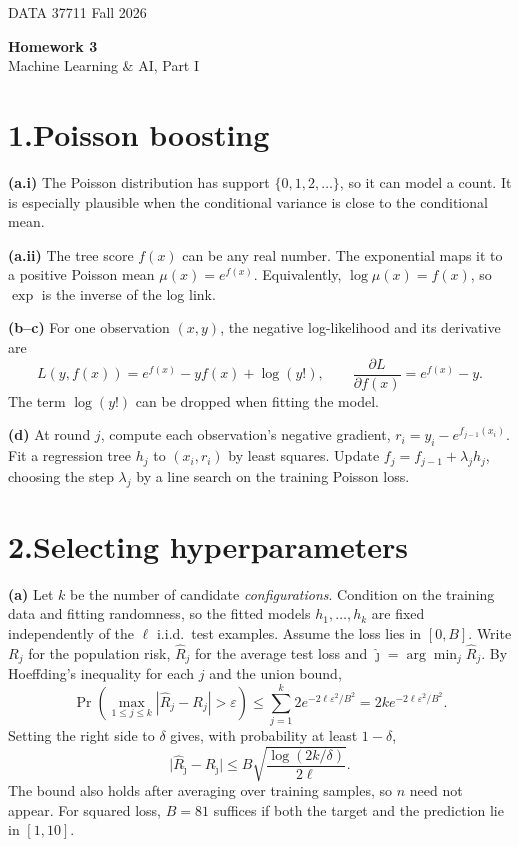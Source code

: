 \documentclass[11pt,letterpaper]{article}
\newcommand{\subpart}[1]{\textbf{(#1)}\enspace}
\newcommand{\Rhat}{\widehat R}
\begin{document}
{\small DATA 37711 \hfill Fall 2026}
\begin{center}
  {\LARGE\bfseries Homework 3}\\[2pt]
  {\large Machine Learning \& AI, Part I}
\end{center}

\section*{1.\quad Poisson boosting}
\subpart{a.i} The Poisson distribution has support $\{0,1,2,\ldots\}$, so it
can model a count. It is especially plausible when the conditional variance
is close to the conditional mean.

\subpart{a.ii} The tree score $f(x)$ can be any real number. The exponential
maps it to a positive Poisson mean $\mu(x)=e^{f(x)}$. Equivalently,
$\log\mu(x)=f(x)$, so $\exp$ is the inverse of the log link.

\subpart{b--c} For one observation $(x,y)$, the negative log-likelihood and
its derivative are
\[
 L(y,f(x))=e^{f(x)}-yf(x)+\log(y!),
 \qquad \frac{\partial L}{\partial f(x)}=e^{f(x)}-y .
\]
The term $\log(y!)$ can be dropped when fitting the model.

\subpart{d} At round $j$, compute each observation's negative gradient,
$r_i=y_i-e^{f_{j-1}(x_i)}$. Fit a regression tree $h_j$ to $(x_i,r_i)$ by
least squares. Update $f_j=f_{j-1}+\lambda_j h_j$, choosing the step
$\lambda_j$ by a line search on the training Poisson loss.

\section*{2.\quad Selecting hyperparameters}
\subpart{a} Let $k$ be the number of candidate \emph{configurations}.
Condition on the training data and fitting randomness, so the fitted models
$h_1,\ldots,h_k$ are fixed independently of the $\ell$ i.i.d.\ test examples.
Assume the loss lies in $[0,B]$. Write $R_j$ for the population risk,
$\Rhat_j$ for the average test loss and
$\hat\jmath=\arg\min_j\Rhat_j$. By Hoeffding's inequality for each $j$ and
the union bound,
\[
 \Pr\!\left(\max_{1\le j\le k}|\Rhat_j-R_j|>\varepsilon\right)
 \le \sum_{j=1}^k 2e^{-2\ell\varepsilon^2/B^2}
 = 2k e^{-2\ell\varepsilon^2/B^2}.
\]
Setting the right side to $\delta$ gives, with probability at least $1-\delta$,
\[
 \boxed{\bigl|\Rhat_{\hat\jmath}-R_{\hat\jmath}\bigr|
 \le B\sqrt{\frac{\log(2k/\delta)}{2\ell}}.}
\]
The bound also holds after averaging over training samples, so $n$ need
not appear. For squared loss, $B=81$ suffices if both the target and the
prediction lie in $[1,10]$.
\end{document}
